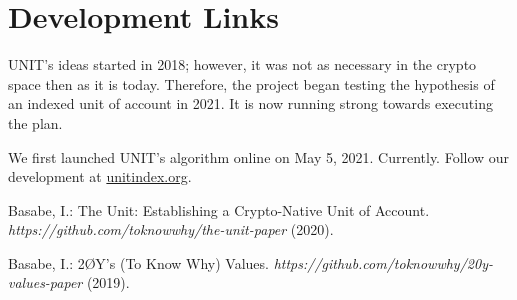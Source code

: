 \documentclass[12pt]{article}
\begin{document}
\section{Development Links}

UNIT’s ideas started in 2018; however, it was not as necessary in the crypto space then as it is today. Therefore, the project began testing the hypothesis of an indexed unit of account in 2021. It is now running strong towards executing the plan.

We first launched UNIT’s algorithm online on May 5, 2021. Currently. Follow our development at \href{http://www.unitindex.org}{unitindex.org}.

\begin{thebibliography}{[BLSWZ9]}


 Basabe, I.: The Unit: Establishing a Crypto-Native Unit of Account. \emph{https://github.com/toknowwhy/the-unit-paper} (2020).


 Basabe, I.: 2ØY's (To Know Why) Values. \emph{https://github.com/toknowwhy/20y-values-paper} (2019).



\end{thebibliography}
\end{document}
